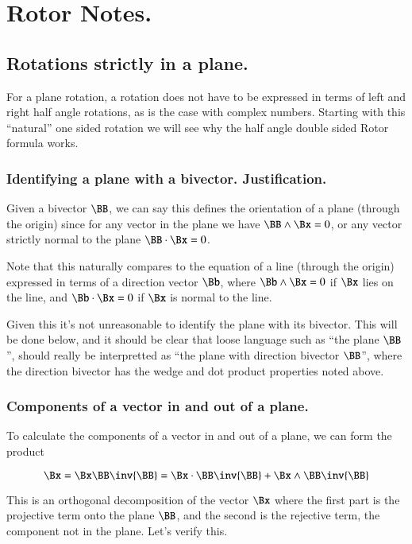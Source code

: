 \chapter{Rotor Notes.} 

\section{Rotations strictly in a plane. }

For a plane rotation, a rotation does not have to
be expressed in terms of left and right half angle rotations, as is the case
with complex numbers.  Starting with this ``natural'' one sided rotation
we will see why the half angle double sided Rotor formula works.

\subsection{Identifying a plane with a bivector.  Justification. }
Given a bivector $\BB$, we can say this defines the orientation of a plane
(through the origin)
since for any vector in the plane we have $\BB \wedge \Bx = 0$, or any vector
strictly normal to the plane $\BB \cdot \Bx = 0$.

Note that this naturally compares
to the equation of a line (through the origin) expressed in terms of a
direction vector $\Bb$,
where $\Bb \wedge \Bx=0$ if $\Bx$ lies on the line, and $\Bb \cdot \Bx = 0$
if $\Bx$ is normal to the line.

Given this it's not unreasonable to identify the plane with its bivector.  This
will be done below, and it should be clear that 
loose language such as ``the plane $\BB$'', should really be interpretted
as ``the plane with direction bivector $\BB$'', where the direction bivector
has the wedge and dot product properties noted above.

\subsection{Components of a vector in and out of a plane. }

To calculate the components of a vector in and out of a plane, we can form
the product

\[
\Bx = \Bx \BB \inv{\BB} = \Bx \cdot \BB \inv{\BB} + \Bx \wedge \BB \inv{\BB}
\]

This is an orthogonal decomposition of the vector $\Bx$ where the first
part is the projective term onto the plane $\BB$, and the second is the rejective
term, the component not in the plane.  Let's verify this.

